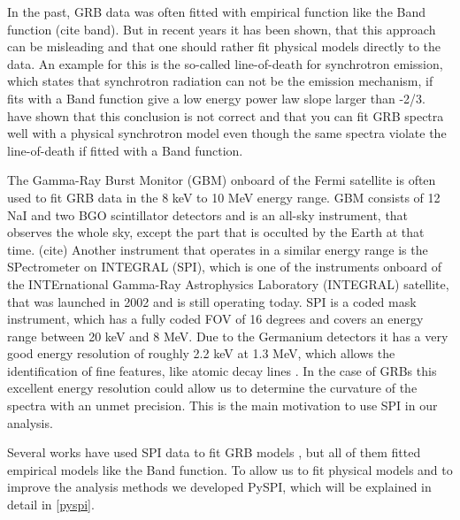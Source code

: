 \documentclass[twocolumn]{aa}
\begin{document}
In the past, GRB data was often fitted with empirical function like the Band function (cite band). But in recent years it has been shown, that this approach can be misleading and that one should rather fit physical models directly to the data. An example for this is the so-called line-of-death for synchrotron emission, which states that synchrotron radiation can not be the emission mechanism, if fits with a Band function give a low energy power law slope larger than -2/3. \citep{line-of-death, line-of-death2}
\citet{synch} have shown that this conclusion is not correct and that you can fit GRB spectra well with a physical synchrotron model even though the same spectra violate the line-of-death if fitted with a Band function.

The Gamma-Ray Burst Monitor (GBM) onboard of the Fermi satellite is often used to fit GRB data in the 8 keV to 10 MeV energy range. GBM consists of 12 NaI and two BGO scintillator detectors and is an all-sky instrument, that observes the whole sky, except the part that is occulted by the Earth at that time. (cite)
Another instrument that operates in a similar energy range is the SPectrometer on INTEGRAL (SPI), which is one of the instruments onboard of the INTErnational Gamma-Ray Astrophysics Laboratory (INTEGRAL) satellite, that was launched in 2002 and is still operating today. SPI is a coded mask instrument, which has a fully coded FOV of 16 degrees and covers an energy range between 20 keV and 8 MeV. Due to the Germanium detectors it has a very good energy resolution of roughly 2.2 keV at 1.3 MeV, which allows the identification of fine features, like atomic decay lines \cite{spi}. In the case of GRBs this excellent energy resolution could allow us to determine the curvature of the spectra with an unmet precision. This is the main motivation to use SPI in our analysis.

Several works have used SPI data to fit GRB models \cite{spi_grb1, spi_grb}, but all of them fitted empirical models like the Band function. To allow us to fit physical models and to improve the analysis methods we developed PySPI, which will be explained in detail in \ref{pyspi}.

\end{document}
